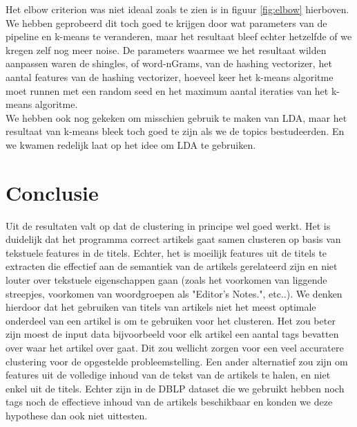 \documentclass[a4paper,fontsize=11pt]{article}
\begin{document}
Het elbow criterion was niet ideaal zoals te zien is in figuur \ref{fig:elbow} hierboven. We hebben geprobeerd dit toch goed te krijgen door wat parameters van de pipeline en k-means te veranderen, maar het resultaat bleef echter hetzelfde of we kregen zelf nog meer noise. De parameters waarmee we het resultaat wilden aanpassen waren de shingles, of word-nGrams, van de hashing vectorizer, het aantal features van de hashing vectorizer, hoeveel keer het k-means algoritme moet runnen met een random seed en het maximum aantal iteraties van het k-means algoritme. \\

We hebben ook nog gekeken om misschien gebruik te maken van LDA, maar het resultaat van k-means bleek toch goed te zijn als we de topics bestudeerden. En we kwamen redelijk laat op het idee om LDA te gebruiken. 



\section{Conclusie}
Uit de resultaten valt op dat de clustering in principe wel goed werkt.
Het is duidelijk dat het programma correct artikels gaat samen clusteren op basis van tekstuele features in de titels.
Echter, het is moeilijk features uit de titels te extracten die effectief aan de semantiek van de artikels gerelateerd zijn en niet louter over tekstuele eigenschappen gaan (zoals het voorkomen van liggende streepjes, voorkomen van woordgroepen als "Editor's Notes.", etc..).
We denken hierdoor dat het gebruiken van titels van artikels niet het meest optimale onderdeel van een artikel is om te gebruiken voor het clusteren.
Het zou beter zijn moest de input data bijvoorbeeld voor elk artikel een aantal tags bevatten over waar het artikel over gaat.
Dit zou wellicht zorgen voor een veel accuratere clustering voor de opgestelde probleemstelling. Een ander alternatief zou zijn om features uit de volledige inhoud van de tekst van de artikels te halen, en niet enkel uit de titels.
Echter zijn in de DBLP dataset die we gebruikt hebben noch tags noch de effectieve inhoud van de artikels beschikbaar en konden we deze hypothese dan ook niet uittesten. 
\end{document}
